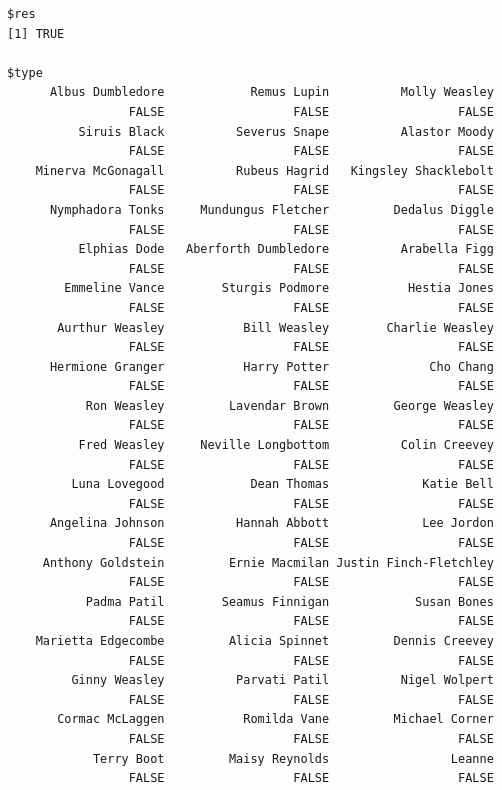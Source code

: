 \documentclass[
  letterpaper,
  DIV=11,
  numbers=noendperiod]{scrreprt}
\begin{document}
\begin{verbatim}
$res
[1] TRUE

$type
      Albus Dumbledore            Remus Lupin          Molly Weasley 
                 FALSE                  FALSE                  FALSE 
          Siruis Black          Severus Snape          Alastor Moody 
                 FALSE                  FALSE                  FALSE 
    Minerva McGonagall          Rubeus Hagrid   Kingsley Shacklebolt 
                 FALSE                  FALSE                  FALSE 
      Nymphadora Tonks     Mundungus Fletcher         Dedalus Diggle 
                 FALSE                  FALSE                  FALSE 
          Elphias Dode   Aberforth Dumbledore          Arabella Figg 
                 FALSE                  FALSE                  FALSE 
        Emmeline Vance        Sturgis Podmore           Hestia Jones 
                 FALSE                  FALSE                  FALSE 
       Aurthur Weasley           Bill Weasley        Charlie Weasley 
                 FALSE                  FALSE                  FALSE 
      Hermione Granger           Harry Potter              Cho Chang 
                 FALSE                  FALSE                  FALSE 
           Ron Weasley         Lavendar Brown         George Weasley 
                 FALSE                  FALSE                  FALSE 
          Fred Weasley     Neville Longbottom          Colin Creevey 
                 FALSE                  FALSE                  FALSE 
         Luna Lovegood            Dean Thomas             Katie Bell 
                 FALSE                  FALSE                  FALSE 
      Angelina Johnson          Hannah Abbott             Lee Jordon 
                 FALSE                  FALSE                  FALSE 
     Anthony Goldstein         Ernie Macmilan Justin Finch-Fletchley 
                 FALSE                  FALSE                  FALSE 
           Padma Patil        Seamus Finnigan            Susan Bones 
                 FALSE                  FALSE                  FALSE 
    Marietta Edgecombe         Alicia Spinnet         Dennis Creevey 
                 FALSE                  FALSE                  FALSE 
         Ginny Weasley          Parvati Patil          Nigel Wolpert 
                 FALSE                  FALSE                  FALSE 
       Cormac McLaggen           Romilda Vane         Michael Corner 
                 FALSE                  FALSE                  FALSE 
            Terry Boot         Maisy Reynolds                 Leanne 
                 FALSE                  FALSE                  FALSE 

\end{verbatim}
\end{document}

